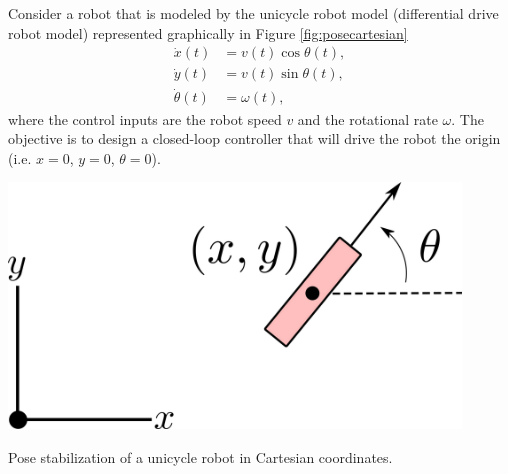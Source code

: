 \begin{example} \label{ex:pose}
\theoremstyle{definition}
\cite{AicardiCasalinoEtAl1995} Consider a robot that is modeled by the unicycle robot model (differential drive robot model) represented graphically in Figure \ref{fig:posecartesian}
\begin{equation} \label{eq:posecartesian}
\begin{split}
\dot{x}(t) &= v(t) \cos\theta(t), \\
\dot{y}(t) &= v(t) \sin\theta(t), \\
\dot{\theta}(t) &= \omega(t),
\end{split}
\end{equation}
where the control inputs are the robot speed $v$ and the rotational rate $\omega$. The objective is to design a closed-loop controller that will drive the robot the origin (i.e. $x=0$, $y=0$, $\theta = 0$).

\begin{marginfigure}
\centering
\includegraphics[width=0.9\textwidth]{tex/figs/ch04_figs/unicycle_cartesian.png}
\caption{Pose stabilization of a unicycle robot in Cartesian coordinates.}
\label{fig:posecartesian}
\end{marginfigure}


\end{example}
